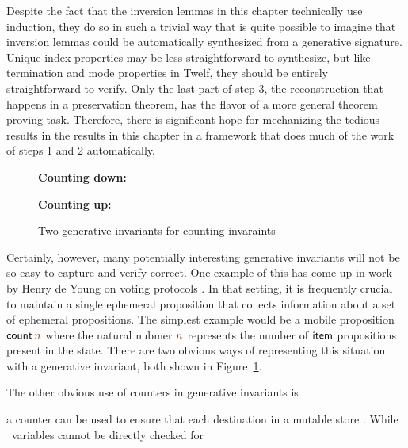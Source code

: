 \noindent
Despite the fact that the inversion lemmas in this chapter technically
use induction, they do so in such a trivial way that is quite possible
to imagine that inversion lemmas could be automatically synthesized
from a generative signature. Unique index properties may be less
straightforward to synthesize, but like termination and mode
properties in Twelf, they should be entirely straightforward to
verify. Only the last part of step 3, the reconstruction that happens
in a preservation theorem, has the flavor of a more general theorem
proving task. Therefore, there is significant hope for mechanizing the
tedious results in the results in this chapter in a framework that
does much of the work of steps 1 and 2 automatically.

\begin{figure}
\noindent
{\bf Counting down:}
\smallskip
{}

\bigskip
\noindent
{\bf Counting up:}
\smallskip
{}
\caption{Two generative invariants for counting invaraints}
\label{fig:gen-count}
\end{figure}

Certainly, however, many potentially interesting generative invariants
will not be so easy to capture and verify correct. One example of this
has come up in work by Henry de Young on voting protocols
\cite{deyoung12linear}. In that setting, it is frequently crucial to
maintain a single ephemeral proposition that collects information
about a set of ephemeral propositions. The simplest example would
be a mobile proposition ${\sf count}\,\lf{n}$ where the natural
nubmer $\lf{n}$ represents the number of ${\sf item}$ propositions 
present in the state. There are two obvious ways of representing
this situation with a generative invariant, both shown in
Figure~\ref{fig:gen-count}. 

\label{sec:pointer-inequality}

The other obvious use of counters in generative invariants is 

 a counter can be used to ensure that each destination
in a mutable store . While \sls~variables cannot be directly
checked for 



